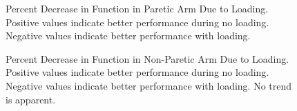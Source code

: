 \documentclass{article}
\begin{document}
\begin{figure}[!ht]
     \centering
     \hfill
	\caption{Percent Decrease in Function in Paretic Arm Due to Loading. Positive values indicate better performance during no loading. Negative values indicate better performance with loading.}
\end{figure}


\begin{figure}[!ht]
     \centering
     \hfill
	\caption{Percent Decrease in Function in Non-Paretic Arm Due to Loading. Positive values indicate better performance during no loading. Negative values indicate better performance with loading. No trend is apparent. }
\end{figure}
\end{document}
